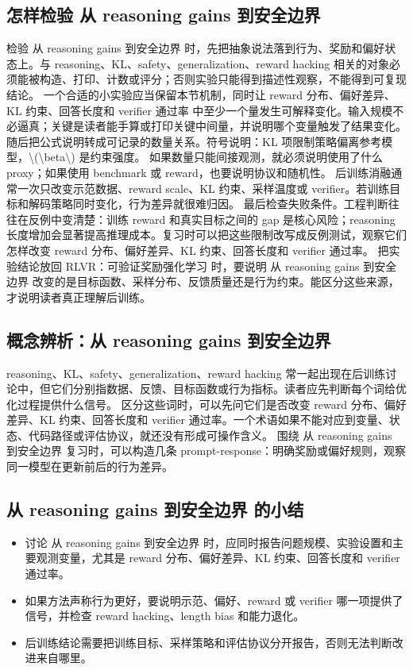 \documentclass[a4paper]{article}
\begin{document}
\subsection{怎样检验 从 reasoning gains 到安全边界}
检验 从 reasoning gains 到安全边界 时，先把抽象说法落到行为、奖励和偏好状态上。与 reasoning、KL、safety、generalization、reward hacking 相关的对象必须能被构造、打印、计数或评分；否则实验只能得到描述性观察，不能得到可复现结论。
一个合适的小实验应当保留本节机制，同时让 reward 分布、偏好差异、KL 约束、回答长度和 verifier 通过率 中至少一个量发生可解释变化。输入规模不必逼真；关键是读者能手算或打印关键中间量，并说明哪个变量触发了结果变化。
随后把公式说明转成可记录的数量关系。符号说明：KL 项限制策略偏离参考模型，\textbackslash{}(\textbackslash{}beta\textbackslash{}) 是约束强度。 如果数量只能间接观测，就必须说明使用了什么 proxy；如果使用 benchmark 或 reward，也要说明协议和随机性。
后训练消融通常一次只改变示范数据、reward scale、KL 约束、采样温度或 verifier。若训练目标和解码策略同时变化，行为差异就很难归因。
最后检查失败条件。工程判断往往在反例中变清楚：训练 reward 和真实目标之间的 gap 是核心风险；reasoning 长度增加会显著提高推理成本。复习时可以把这些限制改写成反例测试，观察它们怎样改变 reward 分布、偏好差异、KL 约束、回答长度和 verifier 通过率。
把实验结论放回 RLVR：可验证奖励强化学习 时，要说明 从 reasoning gains 到安全边界 改变的是目标函数、采样分布、反馈质量还是行为约束。能区分这些来源，才说明读者真正理解后训练。
\subsection{概念辨析：从 reasoning gains 到安全边界}
reasoning、KL、safety、generalization、reward hacking 常一起出现在后训练讨论中，但它们分别指数据、反馈、目标函数或行为指标。读者应先判断每个词给优化过程提供什么信号。
区分这些词时，可以先问它们是否改变 reward 分布、偏好差异、KL 约束、回答长度和 verifier 通过率。一个术语如果不能对应到变量、状态、代码路径或评估协议，就还没有形成可操作含义。
围绕 从 reasoning gains 到安全边界 复习时，可以构造几条 prompt-response：明确奖励或偏好规则，观察同一模型在更新前后的行为差异。
\subsection{从 reasoning gains 到安全边界 的小结}
\begin{itemize}
\item 讨论 从 reasoning gains 到安全边界 时，应同时报告问题规模、实验设置和主要观测变量，尤其是 reward 分布、偏好差异、KL 约束、回答长度和 verifier 通过率。
\item 如果方法声称行为更好，要说明示范、偏好、reward 或 verifier 哪一项提供了信号，并检查 reward hacking、length bias 和能力退化。
\item 后训练结论需要把训练目标、采样策略和评估协议分开报告，否则无法判断改进来自哪里。
\end{itemize}
\end{document}
